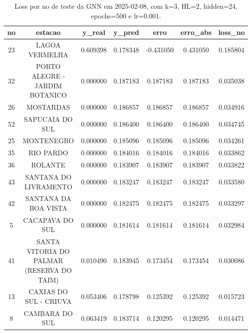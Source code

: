 \begin{table}[h]
\centering
\caption{Loss por no de teste da GNN em 2025-02-08, com k=3, HL=2, hidden=24, epochs=500 e lr=0.001.}
\label{tab:gnn_loss_k3_hl2_h24_e500_d20250208}
\begin{tabular}{ccccccc}
\toprule
no & estacao & y\_real & y\_pred & erro & erro\_abs & loss\_no \\
\midrule
23 & LAGOA VERMELHA & 0.609398 & 0.178348 & -0.431050 & 0.431050 & 0.185804 \\
32 & PORTO ALEGRE - JARDIM BOTANICO & 0.000000 & 0.187183 & 0.187183 & 0.187183 & 0.035038 \\
26 & MOSTARDAS & 0.000000 & 0.186857 & 0.186857 & 0.186857 & 0.034916 \\
52 & SAPUCAIA DO SUL & 0.000000 & 0.186400 & 0.186400 & 0.186400 & 0.034745 \\
25 & MONTENEGRO & 0.000000 & 0.185096 & 0.185096 & 0.185096 & 0.034261 \\
35 & RIO PARDO & 0.000000 & 0.184016 & 0.184016 & 0.184016 & 0.033862 \\
36 & ROLANTE & 0.000000 & 0.183907 & 0.183907 & 0.183907 & 0.033822 \\
43 & SANTANA DO LIVRAMENTO & 0.000000 & 0.183247 & 0.183247 & 0.183247 & 0.033580 \\
42 & SANTANA DA BOA VISTA & 0.000000 & 0.182475 & 0.182475 & 0.182475 & 0.033297 \\
5 & CACAPAVA DO SUL & 0.000000 & 0.181614 & 0.181614 & 0.181614 & 0.032984 \\
41 & SANTA VITORIA DO PALMAR (RESERVA DO TAIM) & 0.010490 & 0.183945 & 0.173454 & 0.173454 & 0.030086 \\
13 & CAXIAS DO SUL - CRIUVA & 0.053406 & 0.178798 & 0.125392 & 0.125392 & 0.015723 \\
8 & CAMBARA DO SUL & 0.063419 & 0.183714 & 0.120295 & 0.120295 & 0.014471 \\
\bottomrule
\end{tabular}
\end{table}
